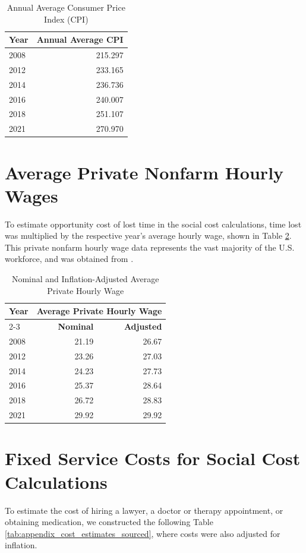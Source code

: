 \begin{table}[ht]
\centering
\caption{Annual Average Consumer Price Index (CPI)}
\label{tab:appendix_cpi}
\begin{tabular}{lr}
\toprule
\textbf{Year} & \textbf{Annual Average CPI} \\
\midrule
2008 & 215.297 \\
2012 & 233.165 \\
2014 & 236.736 \\
2016 & 240.007 \\
2018 & 251.107 \\
2021 & 270.970 \\
\bottomrule
\end{tabular}
\end{table}

\section{Average Private Nonfarm Hourly Wages}
\label{app:hourly_wages}
To estimate opportunity cost of lost time in the social cost calculations, time lost was multiplied by the respective year's average hourly wage, shown in Table \ref{tab:appendix_wage}. This private nonfarm hourly wage data represents the vast majority of the U.S. workforce, and was obtained from \cite{FRED_Wage}.

\begin{table}[ht]
\centering
\caption{Nominal and Inflation-Adjusted Average Private Hourly Wage}
\label{tab:appendix_wage}
\begin{tabular}{lrr}
\toprule
\textbf{Year} & \multicolumn{2}{c}{\textbf{Average Private Hourly Wage}} \\
\cmidrule(lr){2-3} %
& \textbf{Nominal} & \textbf{Adjusted} \\
\midrule
2008 & 21.19 & 26.67 \\
2012 & 23.26 & 27.03 \\
2014 & 24.23 & 27.73 \\
2016 & 25.37 & 28.64 \\
2018 & 26.72 & 28.83 \\
2021 & 29.92 & 29.92 \\
\bottomrule
\end{tabular}
\end{table}

\section{Fixed Service Costs for Social Cost Calculations}
\label{app:fixed_service_costs}
To estimate the cost of hiring a lawyer, a doctor or therapy appointment, or obtaining medication, we constructed the following Table \ref{tab:appendix_cost_estimates_sourced}, where costs were also adjusted for inflation.

